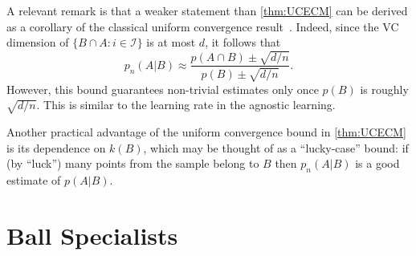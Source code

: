 \documentclass{article}
\newcommand{\I}{\mathcal{I}}
\begin{document}
A relevant remark is that a weaker statement than \ref{thm:UCECM}
can be derived as a corollary of the classical uniform convergence
result~\cite{vapnik}. 
Indeed, since the VC dimension of $\{B\cap A : i\in \I\}$ is at most $d$, it follows that 
\[p_n(A\vert B)\approx\frac{p(A\cap B) \pm \sqrt{d/n}}{p(B)\pm \sqrt{d/n}}.\]
However, this bound guarantees non-trivial estimates only once $p(B)$ is roughly $\sqrt{d/n}$.
This is similar to the learning rate in the agnostic learning.

Another practical advantage of the uniform convergence bound in \ref{thm:UCECM} is its dependence on $k(B)$,
which may be thought of as a ``lucky-case'' bound:
if (by ``luck'') many points from the sample belong to $B$ 
then $p_n(A\vert B)$ is a good estimate of $p(A\vert B)$.

\section{Ball Specialists}
\end{document}
